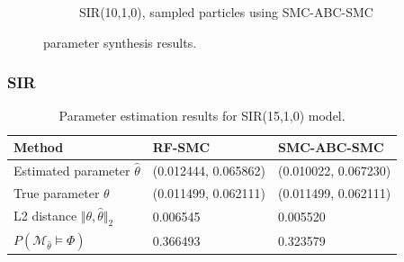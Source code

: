 \documentclass{beamer}
\begin{document}
\begin{frame}
\begin{figure}[H]
\begin{subfigure}{0.48\textwidth}
            \caption{SIR(10,1,0), sampled particles using SMC-ABC-SMC}
        \end{subfigure}
        \caption{ parameter synthesis results.}
    \end{figure}
\end{frame}


\begin{frame}
    \frametitle{SIR}
    \begin{table}[H]
        \begin{tabular}{|l|l|l|}
            \hline
            Method                                           & RF-SMC               & SMC-ABC-SMC          \\ \hline
            Estimated parameter $\hat{\theta}$               & (0.012444, 0.065862) & (0.010022, 0.067230) \\ \hline
            True parameter $\theta$                          & (0.011499, 0.062111) & (0.011499, 0.062111) \\ \hline
            L2 distance $\Vert \theta, \hat{\theta} \Vert_2$ & 0.006545             & 0.005520             \\ \hline
            $P(\mathcal{M}_{\hat{\theta}}\models\Phi)$       & 0.366493             & 0.323579             \\ \hline
        \end{tabular}
        \caption{Parameter estimation results for SIR(15,1,0) model.}
    \end{table}
\end{frame}
\end{document}
